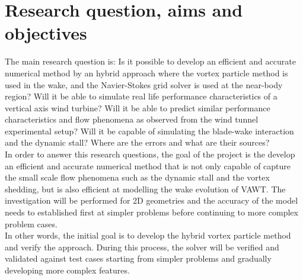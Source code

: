 \section{Research question, aims and objectives}





The main research question is: Is it possible to develop an efficient and accurate numerical method by an hybrid approach where the vortex particle method is used in the wake, and the Navier-Stokes grid solver is used at the near-body region? Will it be able to simulate real life performance characteristics of a vertical axis wind turbine? Will it be able to predict similar performance characteristics and flow phenomena as observed from the wind tunnel experimental setup? Will it be capable of simulating the blade-wake interaction and the dynamic stall? Where are the errors and what are their sources?\\

In order to answer this research questions, the goal of the project is the develop an efficient and accurate numerical method that is not only capable of capture the small scale flow phenomena such as the dynamic stall and the vortex shedding, but is also efficient at modelling the wake evolution of VAWT. The investigation will be performed for 2D geometries and the accuracy of the model needs to established first at simpler problems before continuing to more complex problem cases.\\

In other words, the initial goal is to develop the hybrid vortex particle method and verify  the approach. During this process, the solver will be verified and validated against test cases starting from simpler problems and gradually developing more complex features.\\

